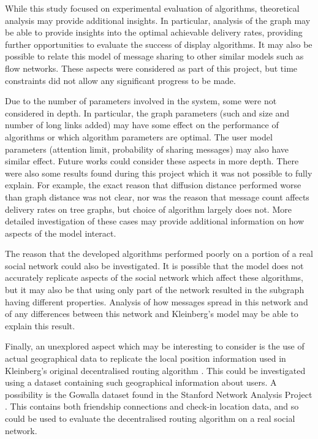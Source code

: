 \documentclass[bsc,frontabs,twoside,singlespacing,parskip,deptreport]{infthesis}     %
\begin{document}
While this study focused on experimental evaluation of algorithms, theoretical analysis may provide additional insights. In particular, analysis of the graph may be able to provide insights into the optimal achievable delivery rates, providing further opportunities to evaluate the success of display algorithms. It may also be possible to relate this model of message sharing to other similar models such as flow networks. These aspects were considered as part of this project, but time constraints did not allow any significant progress to be made.

Due to the number of parameters involved in the system, some were not considered in depth. In particular, the graph parameters (such and size and number of long links added) may have some effect on the performance of algorithms or which algorithm parameters are optimal. The user model parameters (attention limit, probability of sharing messages) may also have similar effect. Future works could consider these aspects in more depth. There were also some results found during this project which it was not possible to fully explain. For example, the exact reason that diffusion distance performed worse than graph distance was not clear, nor was the reason that message count affects delivery rates on tree graphs, but choice of algorithm largely does not. More detailed investigation of these cases may provide additional information on how aspects of the model interact.

The reason that the developed algorithms performed poorly on a portion of a real social network could also be investigated. It is possible that the model does not accurately replicate aspects of the social network which affect these algorithms, but it may also be that using only part of the network resulted in the subgraph having different properties. Analysis of how messages spread in this network and of any differences between this network and Kleinberg's model may be able to explain this result.

Finally, an unexplored aspect which may be interesting to consider is the use of actual geographical data to replicate the local position information used in Kleinberg's original decentralised routing algorithm \cite{Kleinberg00}. This could be investigated using a dataset containing such geographical information about users. A possibility is the Gowalla dataset found in the Stanford Network Analysis Project \cite{snapnets}. This contains both friendship connections and check-in location data, and so could be used to evaluate the decentralised routing algorithm on a real social network.



\end{document}
